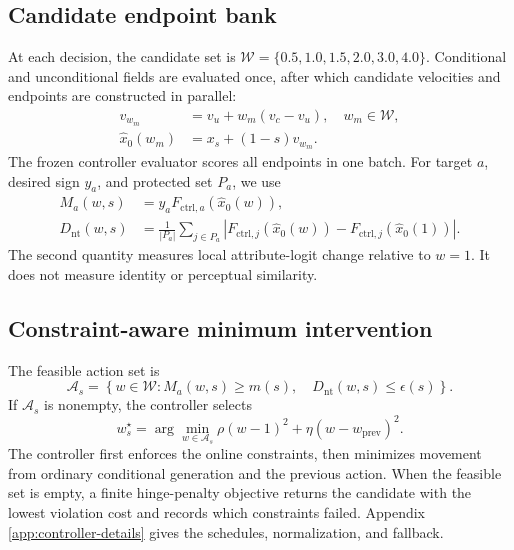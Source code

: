 \documentclass[10pt,twocolumn,letterpaper]{article}
\begin{document}
\subsection{Candidate endpoint bank}

At each decision, the candidate set is
$\mathcal{W}=\{0.5,1.0,1.5,2.0,3.0,4.0\}$. Conditional and unconditional
fields are evaluated once, after which candidate velocities and endpoints are
constructed in parallel:
\begin{align}
    v_{w_m} &= v_u+w_m(v_c-v_u),\quad w_m\in\mathcal{W},
    \label{eq:candidates}\\
    \hat{x}_0(w_m) &= x_s+(1-s)v_{w_m}.
    \label{eq:candidate-endpoints}
\end{align}
The frozen controller evaluator scores all endpoints in one batch. For target
$a$, desired sign $y_a$, and protected set $P_a$, we use
\begin{align}
M_a(w,s)&=y_aF_{\mathrm{ctrl},a}(\hat{x}_0(w)),
    \label{eq:target-margin}\\
D_{\mathrm{nt}}(w,s)&=\frac{1}{|P_a|}\sum_{j\in P_a}
\left|F_{\mathrm{ctrl},j}(\hat{x}_0(w))-F_{\mathrm{ctrl},j}(\hat{x}_0(1))\right|.
    \label{eq:protected-drift}
\end{align}
The second quantity measures local attribute-logit change relative to $w=1$.
It does not measure identity or perceptual similarity.

\subsection{Constraint-aware minimum intervention}

The feasible action set is
\begin{equation}
    \mathcal{A}_s=\left\{w\in\mathcal{W}:M_a(w,s)\geq m(s),\quad
    D_{\mathrm{nt}}(w,s)\leq\epsilon(s)\right\}.
    \label{eq:feasible-set}
\end{equation}
If $\mathcal{A}_s$ is nonempty, the controller selects
\begin{equation}
    w_s^\star=\arg\min_{w\in\mathcal{A}_s}
    \rho(w-1)^2+\eta(w-w_{\mathrm{prev}})^2.
    \label{eq:feasible-objective}
\end{equation}
The controller first enforces the online constraints, then minimizes movement
from ordinary conditional generation and the previous action. When the
feasible set is empty, a finite hinge-penalty objective returns the candidate
with the lowest violation cost and records which constraints failed. Appendix
\ref{app:controller-details} gives the schedules, normalization, and fallback.
\end{document}
